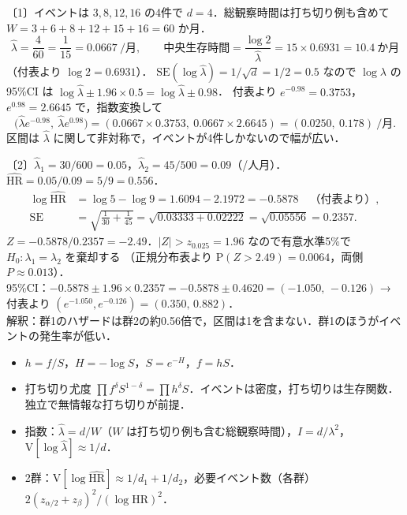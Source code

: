 \documentclass[a4paper,11pt,openany]{ltjsbook}
\newenvironment{kaitou}[1]{%
  \par\medskip\noindent
  \begin{tcolorbox}[enhanced,breakable,colback=bkgray!3,colframe=bkgray!60,boxrule=0.4pt,
    left=4pt,right=4pt,top=2pt,bottom=2pt,arc=1pt,
    title={\cref{#1}の解答},fonttitle=\bfseries\small,coltitle=white,colbacktitle=bkgray!80]}%
  {\end{tcolorbox}\par}
\newcommand{\V}{\mathrm{V}}
\newcommand{\Prob}{\mathrm{P}}
\newcommand{\SE}{\mathrm{SE}}
\newcommand{\HR}{\mathrm{HR}}
\begin{document}
\begin{kaitou}{reidai:m01-2}
〔1〕イベントは $3,8,12,16$ の4件で $d=4$．総観察時間は打ち切り例も含めて $W=3+6+8+12+15+16=60$ か月．
\[
\hat\lambda=\frac{4}{60}=\frac1{15}=0.0667\ /\text{月},\qquad
\text{中央生存時間}=\frac{\log2}{\hat\lambda}=15\times0.6931=10.4\ \text{か月}
\]
（付表より $\log2=0.6931$）．
$\SE(\log\hat\lambda)=1/\sqrt d=1/2=0.5$ なので $\log\lambda$ の95\%CI は $\log\hat\lambda\pm1.96\times0.5=\log\hat\lambda\pm0.98$．
付表より $e^{-0.98}=0.3753$，$e^{0.98}=2.6645$ で，指数変換して
\[
\bigl(\hat\lambda e^{-0.98},\ \hat\lambda e^{0.98}\bigr)=(0.0667\times0.3753,\ 0.0667\times2.6645)=(0.0250,\ 0.178)\ /\text{月}.
\]
区間は $\hat\lambda$ に関して非対称で，イベントが4件しかないので幅が広い．

〔2〕$\hat\lambda_1=30/600=0.05$，$\hat\lambda_2=45/500=0.09$（/人月）．$\widehat{\HR}=0.05/0.09=5/9=0.556$．
\begin{align*}
\log\widehat{\HR}&=\log5-\log9=1.6094-2.1972=-0.5878\quad\text{（付表より）},\\
\SE&=\sqrt{\frac1{30}+\frac1{45}}=\sqrt{0.03333+0.02222}=\sqrt{0.05556}=0.2357 .
\end{align*}
$Z=-0.5878/0.2357=-2.49$．$|Z|>z_{0.025}=1.96$ なので有意水準5\%で $H_0:\lambda_1=\lambda_2$ を棄却する
（正規分布表より $\Prob(Z>2.49)=0.0064$，両側 $P\approx0.013$）．\\
95\%CI：$-0.5878\pm1.96\times0.2357=-0.5878\pm0.4620=(-1.050,\,-0.126)$ → 付表より $(e^{-1.050},e^{-0.126})=(0.350,\,0.882)$．\\
解釈：群1のハザードは群2の約0.56倍で，区間は1を含まない．群1のほうがイベントの発生率が低い．
\end{kaitou}

\begin{summarybox}
\begin{itemize}
\item $h=f/S$，$H=-\log S$，$S=e^{-H}$，$f=hS$．
\item 打ち切り尤度 $\prod f^{\delta}S^{1-\delta}=\prod h^{\delta}S$．イベントは密度，打ち切りは生存関数．独立で無情報な打ち切りが前提．
\item 指数：$\hat\lambda=d/W$（$W$ は打ち切り例も含む総観察時間），$I=d/\lambda^2$，$\V[\log\hat\lambda]\approx1/d$．
\item 2群：$\V[\log\widehat{\HR}]\approx1/d_1+1/d_2$，必要イベント数（各群）$2(z_{\alpha/2}+z_\beta)^2/(\log\HR)^2$．
\end{itemize}
\end{summarybox}
\end{document}
